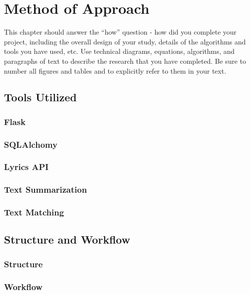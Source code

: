 \chapter{Method of Approach}
\label{ch:method}

This chapter should answer the ``how'' question - how did you complete your project, including the overall design of your study, details of the algorithms and tools you have used, etc.
 Use technical diagrams, equations, algorithms, and paragraphs of text to
describe the research that you have completed. Be sure to number all figures and tables and to explicitly refer to them in your text.

\section{Tools Utilized}

\subsection{Flask}

\subsection{SQLAlchomy}

\subsection{Lyrics API}

\subsection{Text Summarization}

\subsection{Text Matching}

\section{Structure and Workflow}

\subsection{Structure}

\subsection{Workflow}
